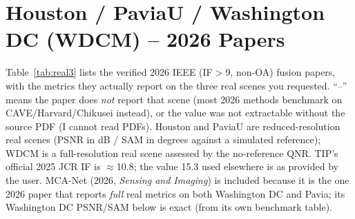 \documentclass[conference]{IEEEtran}
\begin{document}
\section{Houston / PaviaU / Washington DC (WDCM) -- 2026 Papers}

Table~\ref{tab:real3} lists the verified 2026 IEEE (IF$>$9, non-OA) fusion papers, with the
metrics they actually report on the three real scenes you requested. ``--'' means the paper does
\emph{not} report that scene (most 2026 methods benchmark on CAVE/Harvard/Chikusei instead), or
the value was not extractable without the source PDF (I cannot read PDFs). Houston and PaviaU are
reduced-resolution real scenes (PSNR in dB / SAM in degrees against a simulated reference); WDCM is
a full-resolution real scene assessed by the no-reference QNR. TIP's official 2025 JCR IF is
$\approx$10.8; the value 15.3 used elsewhere is as provided by the user. MCA-Net \cite{mcanet2026}
(2026, \emph{Sensing and Imaging}) is included because it is the one 2026 paper that reports
\emph{full} real metrics on both Washington DC and Pavia; its Washington DC PSNR/SAM below is exact
(from its own benchmark table).
\end{document}
